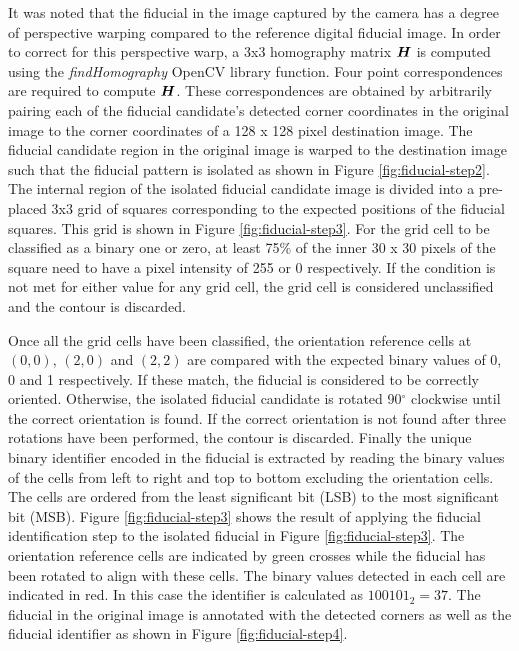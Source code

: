 It was noted that the fiducial in the image captured by the camera has a degree of perspective warping compared to the reference digital fiducial image. In order to correct for this perspective warp, a 3x3 homography matrix $\bm{H}$ is computed using the \textit{findHomography} OpenCV library function. Four point correspondences are required to compute $\bm{H}$. These correspondences are obtained by arbitrarily pairing each of the fiducial candidate's detected corner coordinates in the original image to the corner coordinates of a 128 x 128 pixel destination image. The fiducial candidate region in the original image is warped to the destination image such that the fiducial pattern is isolated as shown in Figure \ref{fig:fiducial-step2}. The internal region of the isolated fiducial candidate image is divided into a pre-placed 3x3 grid of squares corresponding to the expected positions of the fiducial squares. This grid is shown in Figure \ref{fig:fiducial-step3}. For the grid cell to be classified as a binary one or zero, at least 75\% of the inner 30 x 30 pixels of the square need to have a pixel intensity of 255 or 0 respectively. If the condition is not met for either value for any grid cell, the grid cell is considered unclassified and the contour is discarded.

Once all the grid cells have been classified, the orientation reference cells at $(0, 0)$, $(2, 0)$ and $(2,2)$ are compared with the expected binary values of 0, 0 and 1 respectively. If these match, the fiducial is considered to be correctly oriented. Otherwise, the isolated fiducial candidate is rotated 90$^{\circ}$ clockwise until the correct orientation is found. If the correct orientation is not found after three rotations have been performed, the contour is discarded. Finally the unique binary identifier encoded in the fiducial is extracted by reading the binary values of the cells from left to right and top to bottom excluding the orientation cells. The cells are ordered from the least significant bit (LSB) to the most significant bit (MSB). Figure \ref{fig:fiducial-step3} shows the result of applying the fiducial identification step to the isolated fiducial in Figure \ref{fig:fiducial-step3}. The orientation reference cells are indicated by green crosses while the fiducial has been rotated to align with these cells. The binary values detected in each cell are indicated in red. In this case the identifier is calculated as $100101_2=37$. The fiducial in the original image is annotated with the detected corners as well as the fiducial identifier as shown in Figure \ref{fig:fiducial-step4}.

